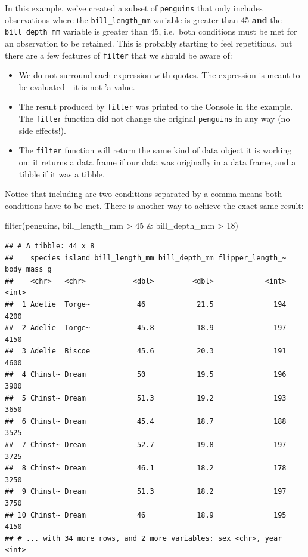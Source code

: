 \documentclass[
]{book}
\newenvironment{Shaded}{\begin{snugshade}}{\end{snugshade}}
\newcommand{\DecValTok}[1]{\textcolor[rgb]{0.00,0.00,0.81}{#1}}
\newcommand{\FunctionTok}[1]{\textcolor[rgb]{0.00,0.00,0.00}{#1}}
\newcommand{\NormalTok}[1]{#1}
\newcommand{\SpecialCharTok}[1]{\textcolor[rgb]{0.00,0.00,0.00}{#1}}
\providecommand{\tightlist}{%
  \setlength{\itemsep}{0pt}\setlength{\parskip}{0pt}}
\begin{document}
In this example, we've created a subset of \texttt{penguins} that only includes observations where the \texttt{bill\_length\_mm} variable is greater than 45 \textbf{and} the \texttt{bill\_depth\_mm} variable is greater than 45, i.e.~both conditions must be met for an observation to be retained. This is probably starting to feel repetitious, but there are a few features of \texttt{filter} that we should be aware of:

\begin{itemize}
\tightlist
\item
  We do not surround each expression with quotes. The expression is meant to be evaluated---it is not 'a value.
\item
  The result produced by \texttt{filter} was printed to the Console in the example. The \texttt{filter} function did not change the original \texttt{penguins} in any way (no side effects!).
\item
  The \texttt{filter} function will return the same kind of data object it is working on: it returns a data frame if our data was originally in a data frame, and a tibble if it was a tibble.
\end{itemize}

Notice that including are two conditions separated by a comma means both conditions have to be met. There is another way to achieve the exact same result:

\begin{Shaded}
\begin{Highlighting}[]
\FunctionTok{filter}\NormalTok{(penguins, bill\_length\_mm }\SpecialCharTok{\textgreater{}} \DecValTok{45} \SpecialCharTok{\&}\NormalTok{ bill\_depth\_mm }\SpecialCharTok{\textgreater{}} \DecValTok{18}\NormalTok{)}
\end{Highlighting}
\end{Shaded}

\begin{verbatim}
## # A tibble: 44 x 8
##    species island bill_length_mm bill_depth_mm flipper_length_~ body_mass_g
##    <chr>   <chr>           <dbl>         <dbl>            <int>       <int>
##  1 Adelie  Torge~           46            21.5              194        4200
##  2 Adelie  Torge~           45.8          18.9              197        4150
##  3 Adelie  Biscoe           45.6          20.3              191        4600
##  4 Chinst~ Dream            50            19.5              196        3900
##  5 Chinst~ Dream            51.3          19.2              193        3650
##  6 Chinst~ Dream            45.4          18.7              188        3525
##  7 Chinst~ Dream            52.7          19.8              197        3725
##  8 Chinst~ Dream            46.1          18.2              178        3250
##  9 Chinst~ Dream            51.3          18.2              197        3750
## 10 Chinst~ Dream            46            18.9              195        4150
## # ... with 34 more rows, and 2 more variables: sex <chr>, year <int>
\end{verbatim}
\end{document}
